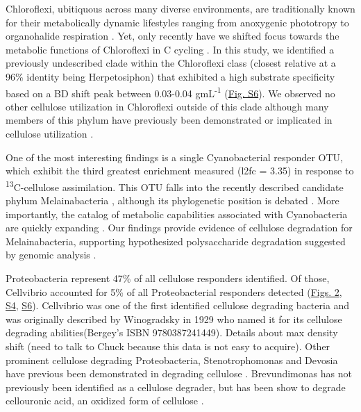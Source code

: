 Chloroflexi, ubitiquous across many diverse environments, are traditionally known for their metabolically dynamic lifestyles ranging from anoxygenic phototropy to organohalide respiration \cite{Hug_2013}. Yet, only recently have we shifted focus towards the metabolic functions of Chloroflexi in C cycling \cite{Hug_2013,Goldfarb_2011,Cole_2013}. In this study, we identified a previously undescribed clade within the Chloroflexi class (closest relative at a 96\% identity being Herpetosiphon) that exhibited a high substrate specificity based on a BD shift peak between 0.03-0.04 gmL\textsuperscript{-1} (\href{https://authorea.com/users/3537/articles/8459/master/file/figures/cellulose_resp_profiles/cellulose_resp_profiles.png}{Fig. S6}). We observed no other cellulose utilization in Chloroflexi outside of this clade although many members of this phylum have previously been demonstrated or implicated in cellulose utilization \cite{Goldfarb_2011,Cole_2013,Hug_2013}. 

One of the most interesting findings is a single Cyanobacterial responder OTU, which exhibit the third greatest enrichment measured (l2fc = 3.35) in response to \textsuperscript{13}C-cellulose assimilation. This OTU falls into the recently described candidate phylum Melainabacteria \cite{Di_Rienzi_2013}, although its phylogenetic position is debated \cite{Soo_2014}. More importantly, the catalog of metabolic capabilities associated with Cyanobacteria are quickly expanding \cite{Di_Rienzi_2013, Soo_2014}. Our findings provide evidence of cellulose degradation for Melainabacteria, supporting hypothesized polysaccharide degradation suggested by genomic analysis \cite{Di_Rienzi_2013}.     

Proteobacteria represent 47\% of all cellulose responders identified.  Of those, Cellvibrio accounted for 5\% of all Proteobacterial responders detected (\href{https://www.authorea.com/users/3537/articles/3612/master/file/figures/l2fc_fig1/l2fc_fig.pdf}{Figs. 2}, \href{https://authorea.com/users/3537/articles/8459/master/file/figures/l2fc_fig_pVal/l2fc_fig_pVal.png}{S4}, \href{https://authorea.com/users/3537/articles/8459/master/file/figures/cellulose_resp_profiles/cellulose_resp_profiles.png}{S6}). Cellvibrio was one of the first identified cellulose degrading bacteria and was originally described by Winogradsky in 1929 who named it for its cellulose degrading abilities(Bergey's ISBN 9780387241449). Details about max density shift (need to talk to Chuck because this data is not easy to acquire). Other prominent cellulose degrading Proteobacteria, Stenotrophomonas and Devosia have previous been demonstrated in degrading cellulose \cite{Trujillo_Cabrera_2012, Verastegui_2014}. Brevundimonas has not previously been identified as a cellulose degrader, but has been show to degrade cellouronic acid, an oxidized form of cellulose \cite{Tavernier_2008}.

